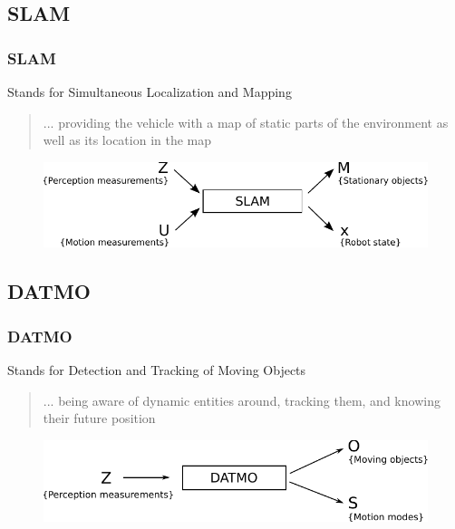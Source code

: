 \documentclass{beamer}
\begin{document}
	\subsection{SLAM}
		\begin{frame}
			\frametitle{SLAM}
			
			\begin{block}{Stands for}				
				Simultaneous Localization and Mapping
			\end{block}
			
			\begin{quotation}
				... providing the vehicle with a map of static parts of the environment as well as its location in the map \cite{DBLP:journals/inffus/VuBA11}
			\end{quotation}			
			
			\begin{figure}[h]
				\center
				\includegraphics[scale=0.8]{../img/fig:perception:slam}
			 \end{figure}			
			
		\end{frame}
	
	\subsection{DATMO}
		\begin{frame}
			\frametitle{DATMO}
			\begin{block}{Stands for}				
				Detection and Tracking of Moving Objects
			\end{block}
			\begin{quotation}
				... being aware of dynamic entities around, tracking them, and knowing their future position \cite{DBLP:journals/inffus/VuBA11}
			\end{quotation}				
			\begin{figure}[h]
				\center
				\includegraphics[scale=0.8]{../img/fig:datmo:process}
			 \end{figure}		
		\end{frame}
\end{document}
